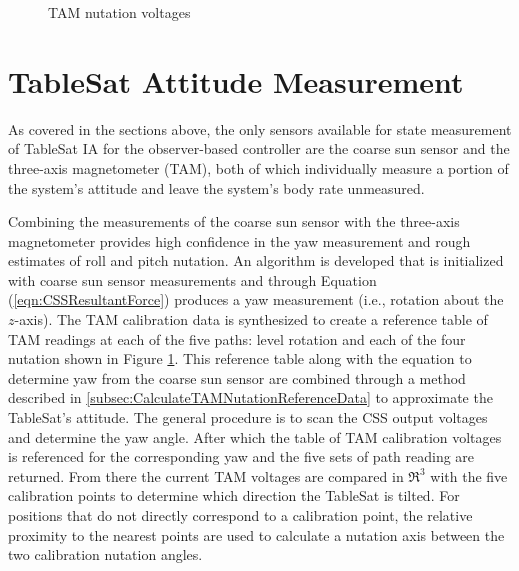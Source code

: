 \begin{figure}[H]
  \centerline{}
  \caption{TAM nutation voltages}
  \label{fig:TAMNutationVoltages}
\end{figure}

\section{TableSat Attitude Measurement}
\label{subsec:StateMeasurement}

As covered in the sections above, the only sensors available for state measurement of TableSat IA for the observer-based controller are the coarse sun sensor and the three-axis magnetometer (TAM), both of which individually measure a portion of the system's attitude and leave the system's body rate unmeasured.

Combining the measurements of the coarse sun sensor with the three-axis magnetometer provides high confidence in the yaw measurement and rough estimates of roll and pitch nutation.  An algorithm is developed that is initialized with coarse sun sensor measurements and through Equation (\ref{eqn:CSSResultantForce}) produces a yaw measurement (i.e., rotation about the $z$-axis).  The TAM calibration data is synthesized to create a reference table of TAM readings at each of the five paths: level rotation and each of the four nutation shown in Figure \ref{fig:TAMNutationVoltages}.  This reference table along with the equation to determine yaw from the coarse sun sensor are combined through a method described in \ref{subsec:CalculateTAMNutationReferenceData} to approximate the TableSat's attitude.  The general procedure is to scan the CSS output voltages and determine the yaw angle.  After which the table of TAM calibration voltages is referenced for the corresponding yaw and the five sets of path reading are returned.  From there the current TAM voltages are compared in $\Re^3$ with the five calibration points to determine which direction the TableSat is tilted.  For positions that do not directly correspond to a calibration point, the relative proximity to the nearest points are used to calculate a nutation axis between the two calibration nutation angles.
